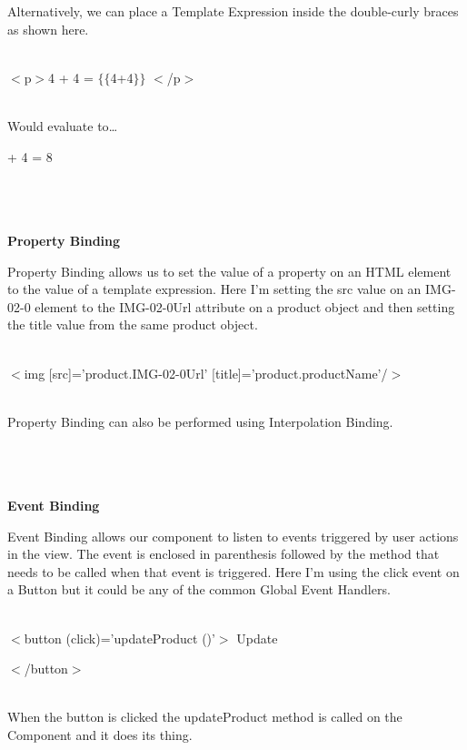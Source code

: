 \documentclass{article}
\begin{document}
\noindent 

\noindent Alternatively, we can place a Template Expression inside the double-curly braces as shown here.

\noindent 

\noindent \\ $\mathrm{<}$p$\mathrm{>}$4 + 4 = $\mathrm{\{}$$\mathrm{\{}$4+4$\mathrm{\}}$$\mathrm{\}}$ $\mathrm{<}$/p$\mathrm{>}$

\noindent 

\noindent \\ Would evaluate to{\dots}

 + 4 = 8

\noindent 
\\  
\newpage
{\large \noindent \\ \\ \textbf{Property Binding}}

\noindent Property Binding allows us to set the value of a property on an HTML element to the value of a template expression. Here I'm setting the src value on an IMG-02-0 element to the IMG-02-0Url attribute on a product object and then setting the title value from the same product object.

\noindent \\ $\mathrm{<}$img [src]='product.IMG-02-0Url' [title]='product.productName'/$\mathrm{>}$

\noindent \\ Property Binding can also be performed using Interpolation Binding.

\noindent 
\\  
{\large \noindent \\ \\ \textbf{Event Binding}}

\noindent Event Binding allows our component to listen to events triggered by user actions in the view. The event is enclosed in parenthesis followed by the method that needs to be called when that event is triggered. Here I'm using the click event on a Button but it could be any of the common Global Event Handlers.

\noindent \\ $\mathrm{<}$button (click)='updateProduct ()'$\mathrm{>}$ Update

 $\mathrm{<}$/button$\mathrm{>}$

\noindent \\ When the button is clicked the updateProduct method is called on the Component and it does its thing.
\end{document}
